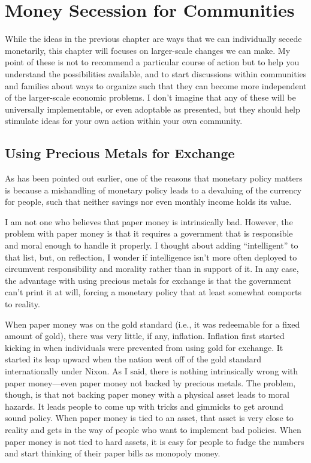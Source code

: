\chapter{Money Secession for Communities}

While the ideas in the previous chapter are ways that we can
individually secede monetarily, this chapter will focuses on
larger-scale changes we can make. My point of these is not to recommend
a particular course of action but to help you understand the
possibilities available, and to start discussions within communities
and families about ways to organize such that they can become more
independent of the larger-scale economic problems. I don’t imagine that
any of these will be universally implementable, or even adoptable as
presented, but they should help stimulate ideas for your own action
within your own community.

\section{Using Precious Metals for Exchange}

As has been pointed out
earlier, one of the reasons that monetary policy matters is because a
mishandling of monetary policy leads to a devaluing of the currency for
people, such that neither savings nor even monthly income holds its
value.

I am not one who believes that paper money is intrinsically bad.
However, the problem with paper money is that it requires a government
that is responsible and moral enough to handle it properly. I thought
about adding “intelligent” to that list, but, on reflection, I wonder
if intelligence isn’t more often deployed to circumvent responsibility
and morality rather than in support of it. In any case, the advantage
with using precious metals for exchange is that the government can’t
print it at will, forcing a monetary policy that at least somewhat
comports to reality.

When paper money was on the gold standard (i.e., it was redeemable for a
fixed amount of gold), there was very little, if any, inflation.
Inflation first started kicking in when individuals were prevented from
using gold for exchange. It started its leap upward when the nation
went off of the gold standard internationally under Nixon. As I said,
there is nothing intrinsically wrong with paper money—even paper money
not backed by precious metals. The problem, though, is that not backing
paper money with a physical asset leads to moral hazards. It leads
people to come up with tricks and gimmicks to get around sound policy.
When paper money is tied to an asset, that asset is very close to
reality and gets in the way of people who want to implement bad
policies. When paper money is not tied to hard assets, it is easy for
people to fudge the numbers and start thinking of their paper bills as
monopoly money.

